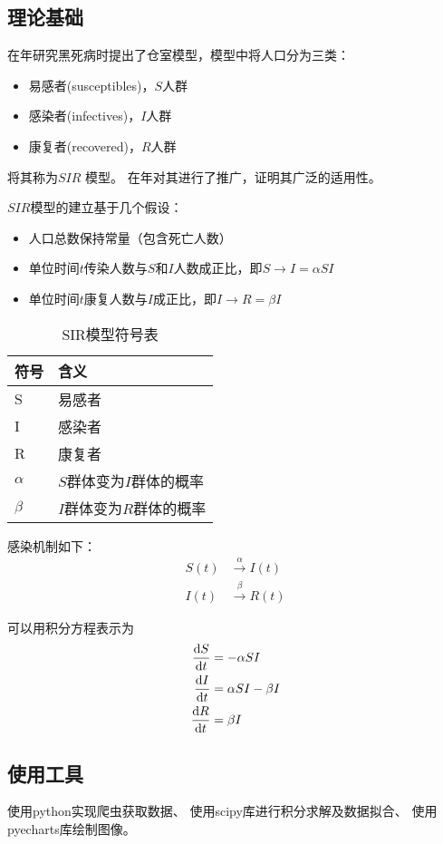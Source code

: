 \subsection{理论基础}
\citeauthor{对流行病数学理论的贡献}在\citeyear{对流行病数学理论的贡献}年研究黑死病时提出了仓室模型，模型中将人口分为三类：
\begin{itemize}
    \item 易感者(susceptibles)，$S$人群
    \item 感染者(infectives)，$I$人群
    \item 康复者(recovered)，$R$人群
\end{itemize}
\par 将其称为$SIR$
\cite{对流行病数学理论的贡献}模型。
\citeauthor{Kermack-McKendrick确定性流行病模型的推广}在\citeyear{Kermack-McKendrick确定性流行病模型的推广}年对其进行了推广\cite{Kermack-McKendrick确定性流行病模型的推广}，证明其广泛的适用性。
\par $SIR$模型的建立基于几个假设\cite{对流行病数学理论的贡献}：
\begin{itemize}
    \item 人口总数保持常量（包含死亡人数）
    \item 单位时间$t$传染人数与$S$和$I$人数成正比，即$S\to I = \alpha SI$
    \item 单位时间$t$康复人数与$I$成正比，即$I\to R = \beta I$
\end{itemize}
\begin{table}[H]
    \centering
    \caption{SIR模型符号表}
    \label{table:SIR模型符号表}
    \begin{tabular}{ll}
        \hline
        符号     & 含义                     \\
        \hline
        S        & 易感者                   \\
        I        & 感染者                   \\
        R        & 康复者                   \\
        $\alpha$ & $S$群体变为$I$群体的概率 \\
        $\beta$  & $I$群体变为$R$群体的概率 \\
        \hline
    \end{tabular}
\end{table}
\par 感染机制如下：
\begin{align}
    S(t) & \xrightarrow \alpha I(t) \\
    I(t) & \xrightarrow \beta R(t)
\end{align}
\par 可以用积分方程表示为
\begin{align}
    \frac{\mathrm{d}S}{\mathrm{d}t} & = -\alpha SI          \\
    \frac{\mathrm{d}I}{\mathrm{d}t} & = \alpha SI - \beta I \\
    \frac{\mathrm{d}R}{\mathrm{d}t} & = \beta I
\end{align}
\subsection{使用工具}
使用python实现爬虫获取数据、
使用scipy库进行积分求解及数据拟合、
使用pyecharts库绘制图像。